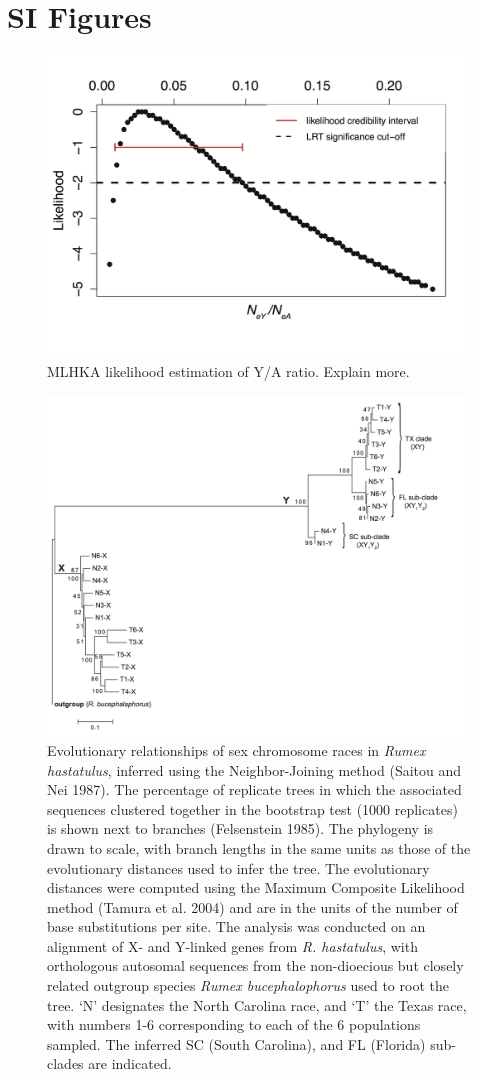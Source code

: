 \documentclass[9pt,onecolumn,twoside]{pnas-new}
\begin{document}
\section*{SI Figures}

\begin{figure}[tbhp!]
\centering
\includegraphics[width=.5\linewidth]{FigureS1.png}
\caption{MLHKA likelihood estimation of Y/A ratio. Explain more.}
\label{figure:FigureS1}
\end{figure}

\begin{figure}[tbhp!]
\centering
\includegraphics[width=.9\linewidth]{FigureS2.png}
\caption{Evolutionary relationships of sex chromosome races in \textit{Rumex hastatulus}, inferred using the Neighbor-Joining method (Saitou and Nei 1987). The percentage of replicate trees in which the associated sequences clustered together in the bootstrap test (1000 replicates) is shown next to branches (Felsenstein 1985). The phylogeny is drawn to scale, with branch lengths in the same units as those of the evolutionary distances used to infer the tree. The evolutionary distances were computed using the Maximum Composite Likelihood method (Tamura et al. 2004) and are in the units of the number of base substitutions per site. The analysis was conducted on an alignment of X- and Y-linked genes from \textit{R. hastatulus}, with orthologous autosomal sequences from the non-dioecious but closely related outgroup species \textit{Rumex bucephalophorus} used to root the tree. ‘N’ designates the North Carolina race, and ‘T’ the Texas race, with numbers 1-6 corresponding to each of the 6 populations sampled. The inferred SC (South Carolina), and FL (Florida) sub-clades are indicated.}
\label{figure:FigureS2}
\end{figure}
\end{document}

